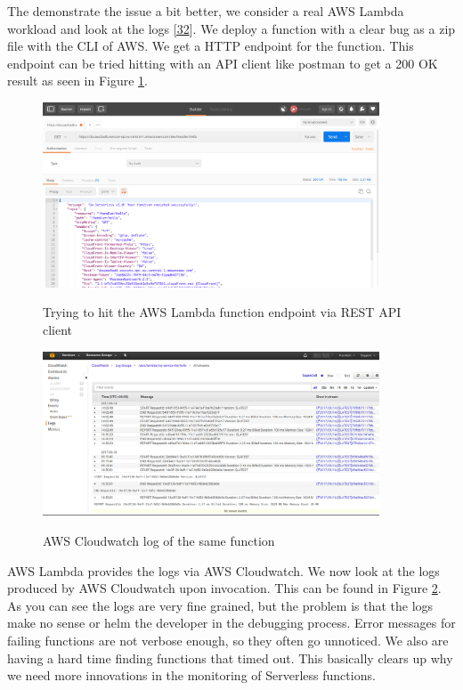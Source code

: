 \documentclass[12pt,titlepage]{article}
\begin{document}
The demonstrate the issue a bit better, we consider a real AWS Lambda workload
and look at the logs \hyperref[ref:32]{[32}]. We deploy a function with a clear bug as a zip file with the
CLI of AWS. We get a HTTP endpoint for the function. This endpoint can be tried
hitting with an API client like postman to get a 200 OK result as seen in
Figure \ref{fig:postman}.
\begin{figure}[!h]
    \caption{Trying to hit the AWS Lambda function endpoint via REST API client}
    \centering
    \includegraphics[width=100mm]{./thesis_images/postman.png}
    \label{fig:postman}
\end{figure}
\begin{figure}[!h]
    \caption{AWS Cloudwatch log of the same function}
    \centering
    \includegraphics[width=100mm]{./thesis_images/cloudwatch.png}
    \label{fig:cloudwatch}
\end{figure}

AWS Lambda provides the logs via AWS Cloudwatch. We now look at the logs
produced by AWS Cloudwatch upon invocation. This can be found in Figure \ref{fig:cloudwatch}. As
you can see the logs are very fine grained, but the problem is that the logs
make no sense or helm the developer in the debugging process. Error messages for
failing functions are not verbose enough, so they often go unnoticed. We also are
having a hard time finding functions that timed out. This basically clears up
why we need more innovations in the monitoring of Serverless functions.
\end{document}
